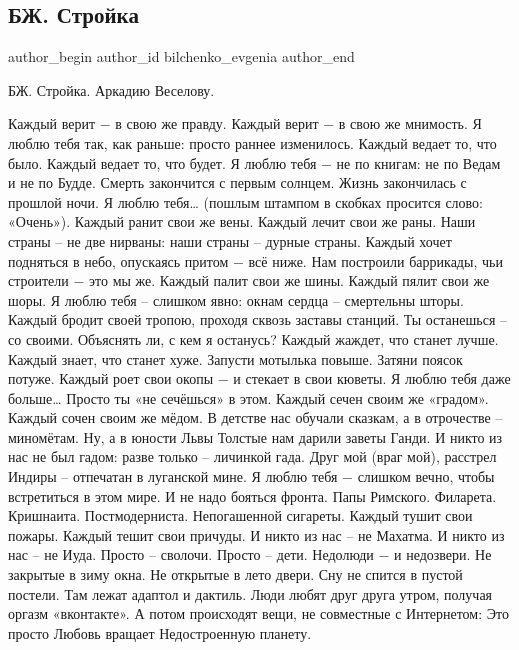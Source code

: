  
 
 
 
 
 
\subsection{БЖ. Стройка}
\label{sec:30_12_2014.fb.bilchenko_evgenia.1.strojka}
\ifcmt
 author_begin
   author_id bilchenko_evgenia
 author_end
\fi

БЖ. Стройка.
Аркадию Веселову.

\obeycr
Каждый верит − в свою же правду. Каждый верит − в свою же мнимость.
Я люблю тебя так, как раньше: просто раннее изменилось.
Каждый ведает то, что было. Каждый ведает то, что будет.
Я люблю тебя − не по книгам: не по Ведам и не по Будде.
\smallskip
Смерть закончится с первым солнцем. Жизнь закончилась с прошлой ночи.
Я люблю тебя… (пошлым штампом в скобках просится слово: «Очень»).
Каждый ранит свои же вены. Каждый лечит свои же раны.
Наши страны – не две нирваны: наши страны – дурные страны.
\smallskip
Каждый хочет подняться в небо, опускаясь притом − всё ниже.
Нам построили баррикады, чьи строители  − это мы же.
Каждый палит свои же шины. Каждый пялит свои же шоры.
Я люблю тебя – слишком явно: окнам сердца – смертельны шторы.
\smallskip
Каждый бродит своей тропою, проходя сквозь заставы станций.
Ты останешься – со своими. Объяснять ли, с кем я останусь?
Каждый жаждет, что станет лучше. Каждый знает, что станет хуже.
Запусти мотылька повыше. Затяни поясок потуже. 
\smallskip
Каждый роет свои окопы − и стекает в свои кюветы.
Я люблю тебя даже больше… Просто ты «не сечёшься» в этом.
Каждый сечен своим же «градом». Каждый сочен своим же мёдом.
В детстве нас обучали сказкам, а в отрочестве – миномётам.
Ну, а в юности Львы Толстые нам дарили заветы Ганди.
\smallskip
И никто из нас не был гадом: разве только – личинкой гада. 
Друг мой (враг мой), расстрел Индиры – отпечатан в луганской мине.
Я люблю тебя − слишком вечно, чтобы встретиться в этом мире.
И не надо бояться фронта. Папы Римского. Филарета.
\smallskip
Кришнаита. Постмодерниста. Непогашенной сигареты.
Каждый тушит свои пожары. Каждый тешит свои причуды.
И никто из нас – не Махатма. И никто из нас – не Иуда.
Просто – сволочи. Просто – дети. Недолюди − и недозвери.
\smallskip
Не закрытые в зиму окна. Не открытые в лето двери.
Сну не спится в пустой постели. Там лежат адаптол и дактиль.
Люди любят друг друга утром, получая оргазм «вконтакте».
\smallskip
А потом происходят вещи, не совместные с Интернетом:
Это просто Любовь вращает 
Недостроенную планету.
\restorecr

